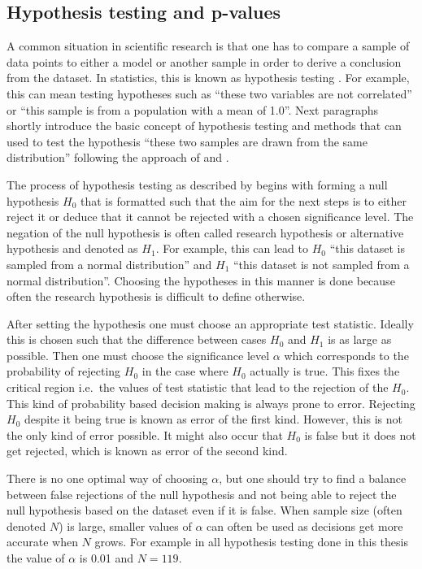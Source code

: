 \documentclass[english, twoside]{HYgradu}
\begin{document}
\subsection{Hypothesis testing and p-values}
A common situation in scientific research is that one has to compare a sample of data points to either a model or another sample in order to derive a conclusion from the dataset. In statistics, this is known as hypothesis testing \citep{wall2003practical}. For example, this can mean testing hypotheses such as ``these two variables are not correlated'' or ``this sample is from a population with a mean of 1.0''. Next paragraphs shortly introduce the basic concept of hypothesis testing and methods that can used to test the hypothesis ``these two samples are drawn from the same distribution'' following the approach of \citet{bohm2010introduction} and \citet{wall2003practical}.

The process of hypothesis testing as described by \citet{bohm2010introduction} begins with forming a null hypothesis $H_0$ that is formatted such that the aim for the next steps is to either reject it or deduce that it cannot be rejected with a chosen significance level. The negation of the null hypothesis is often called research hypothesis or alternative hypothesis and denoted as $H_1$. For example, this can lead to $H_0$ ``this dataset is sampled from a normal distribution'' and $H_1$ ``this dataset is not sampled from a normal distribution''. Choosing the hypotheses in this manner is done because often the research hypothesis is difficult to define otherwise.

After setting the hypothesis one must choose an appropriate test statistic. Ideally this is chosen such that the difference between cases $H_0$ and $H_1$ is as large as possible. Then one must choose 
the significance level $\alpha$ which corresponds to the probability of rejecting $H_0$ in the case where $H_0$ actually is true. This fixes the critical region i.e.\ the values of test statistic that lead to the rejection of the $H_0$. This kind of probability based decision making is always prone to error. Rejecting $H_0$ despite it being true is known as error of the first kind. However, this is not the only kind of error possible. It might also occur that $H_0$ is false but it does not get rejected, which is known as error of the second kind.

There is no one optimal way of choosing $\alpha$, but one should try to find a balance between false rejections of the null hypothesis and not being able to reject the null hypothesis based on the dataset even if it is false. When sample size (often denoted $N$) is large, smaller values of $\alpha$ can often be used as decisions get more accurate when $N$ grows. For example in all hypothesis testing done in this thesis the value of $\alpha$ is 0.01 and $N=119$.
\end{document}
